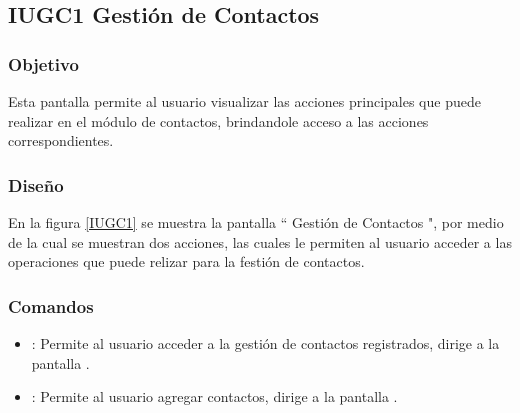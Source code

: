 \subsection{IUGC1 Gestión de Contactos}

\subsubsection{Objetivo}

	
    Esta pantalla permite al usuario visualizar las acciones principales que puede realizar en el módulo de contactos, brindandole acceso a las acciones correspondientes.

\subsubsection{Diseño}


    En la figura \ref{IUGC1} se muestra la pantalla `` Gestión de Contactos ", por medio de la cual se muestran dos acciones, las cuales le permiten al usuario acceder a las operaciones que puede relizar para la festión de contactos.\\


\subsubsection{Comandos}
    \begin{itemize}
    	\item {}: Permite al usuario acceder a la gestión de contactos registrados, dirige a la pantalla .
        \item {}: Permite al usuario agregar contactos, dirige a la pantalla .
    \end{itemize}


